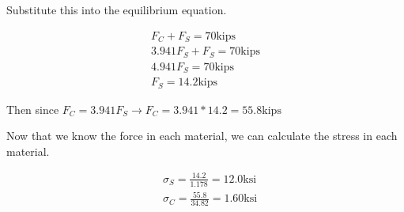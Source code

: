 \documentclass[
  letterpaper,
  DIV=11,
  numbers=noendperiod]{scrreprt}
\begin{document}
\begin{tcolorbox}
\begin{tcolorbox}
Substitute this into the equilibrium equation.

\[
\begin{gathered}
F_C+F_S=70 \mathrm{kips} \\
3.941 F_S+F_S=70 \mathrm{kips} \\
4.941 F_S=70 \mathrm{kips} \\
F_S=14.2 \mathrm{kips}
\end{gathered}
\]

Then since
\(F_C=3.941 F_S \rightarrow F_C=3.941 * 14.2=55.8 \mathrm{kips}\)

Now that we know the force in each material, we can calculate the stress
in each material.

\[
\begin{aligned}
& \sigma_S=\frac{14.2}{1.178}=12.0 \mathrm{ksi} \\
& \sigma_C=\frac{55.8}{34.82}=1.60 \mathrm{ksi}
\end{aligned}
\]

\end{tcolorbox}

\end{tcolorbox}
\end{document}
